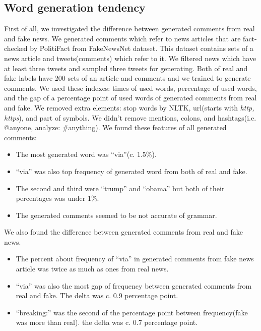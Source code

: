 \documentclass[conference]{IEEEtran}
\begin{document}
\subsection{Word generation tendency}
\label{subsec:trend}
First of all, we investigated the difference between generated comments from real and fake news.
We generated comments which refer to news articles that are fact-checked by PolitiFact from FakeNewsNet dataset\cite{Shu2018FakeNewsNetAD}.
This dataset contains sets of a news article and tweets(comments) which refer to it.
We filtered news which have at least three tweets and sampled three tweets for generating.
Both of real and fake labels have 200 sets of an article and comments and we trained to generate comments. 
We used these indexes: times of used words, percentage of used words, and the gap of a percentage point of used words of generated comments from real and fake.
We removed extra elements: stop words by NLTK, url(starts with \textit{http, https}), and part of symbols.
We didn't remove mentions, colons, and hashtags(i.e. @anyone, analyze: \#anything).
We found these features of all generated comments:
\begin{itemize}[]
    \item The most generated word was ``via''(c. 1.5\%).  
    \item ``via'' was also top frequency of generated word from both of real and fake. 
    \item The second and third were ``trump'' and ``obama'' but both of their percentages was under 1\%.
    \item The generated comments seemed to be not accurate of grammar.
\end{itemize}
We also found the difference between generated comments from real and fake news.
\begin{itemize}[]
    \item The percent about frequency of ``via'' in generated comments from fake news article was twice as much as ones from real news.
    \item ``via'' was also the most gap of frequency between generated comments from real and fake.  The delta was c. 0.9 percentage point.
    \item ``breaking:'' was the second of the percentage point between frequency(fake was more than real). the delta was c. 0.7 percentage point.
\end{itemize}
\end{document}
